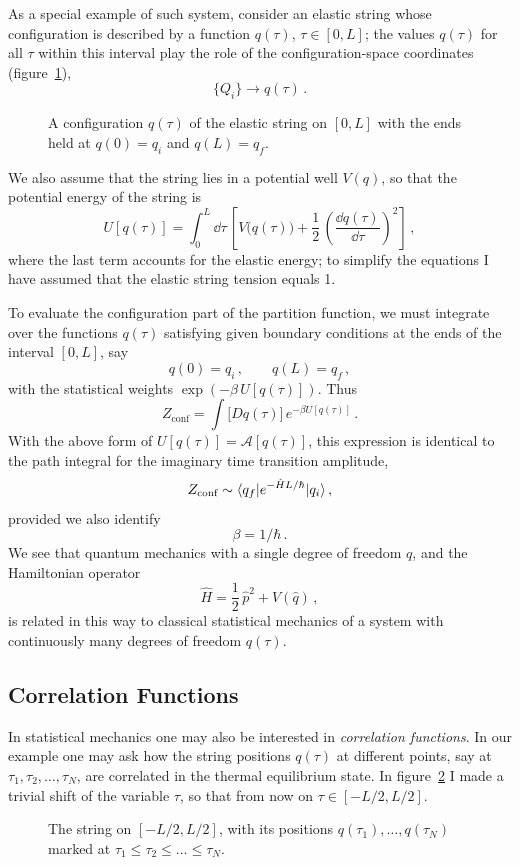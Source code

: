 As a special example of such system, consider an elastic string whose
configuration is described by a function $q(\tau)$, $\tau\in[0,L]$; the values
$q(\tau)$ for all $\tau$ within this interval play the role of the
configuration-space coordinates (figure~\ref{fig:string}),
\[
\{Q_i\}\to q(\tau)\,.
\]
\begin{figure}[ht]
\centering{}
\caption{A configuration $q(\tau)$ of the elastic string on $[0,L]$ with the
ends held at $q(0)=q_i$ and $q(L)=q_f$.}
\label{fig:string}
\end{figure}
We also assume that the string lies in a potential well $V(q)$, so that the
potential energy of the string is
\[
U[q(\tau)]=\int_0^L\dd\tau\,\left[V\bigl(q(\tau)\bigr)+\frac12\,\left(\frac{\dd q(\tau)}{\dd\tau}\right)^2\right]\,,
\]
where the last term accounts for the elastic energy; to simplify the equations
I have assumed that the elastic string tension equals 1.

To evaluate the configuration part of the partition function, we must
integrate over the functions $q(\tau)$ satisfying given boundary conditions at
the ends of the interval $[0,L]$, say
\[
q(0)=q_i\,,\qquad q(L)=q_f\,,
\]
with the statistical weights $\exp(-\beta\,U[q(\tau)])$. Thus
\[
Z_{\text{conf}}=\int\bigl[Dq(\tau)\bigr]\,e^{-\beta U[q(\tau)]}\,.
\]
With the above form of $U[q(\tau)]=\mathcal A[q(\tau)]$, this expression is
identical to the path integral for the imaginary time transition amplitude,
\[
Z_{\text{conf}}\sim\langle q_f|e^{-\hat HL/\hbar}|q_i\rangle\,,
\]
provided we also identify
\[
\beta=1/\hbar\,.
\]
We see that quantum mechanics with a single degree of freedom $q$, and the
Hamiltonian operator
\[
\hat H=\frac12\,\hat p^2+V(\hat q)\,,
\]
is related in this way to classical statistical mechanics of a system with
continuously many degrees of freedom $q(\tau)$.

\subsection*{Correlation Functions}

In statistical mechanics one may also be interested in \emph{correlation
functions}. In our example one may ask how the string positions $q(\tau)$ at
different points, say at $\tau_1,\tau_2,\dots,\tau_N$, are correlated in the
thermal equilibrium state. In figure~\ref{fig:stringcorr} I made a trivial
shift of the variable $\tau$, so that from now on $\tau\in[-L/2,L/2]$.
\begin{figure}[ht]
\centering{}
\caption{The string on $[-L/2,L/2]$, with its positions $q(\tau_1),\dots,q(\tau_N)$
marked at $\tau_1\le\tau_2\le\dots\le\tau_N$.}
\label{fig:stringcorr}
\end{figure}

